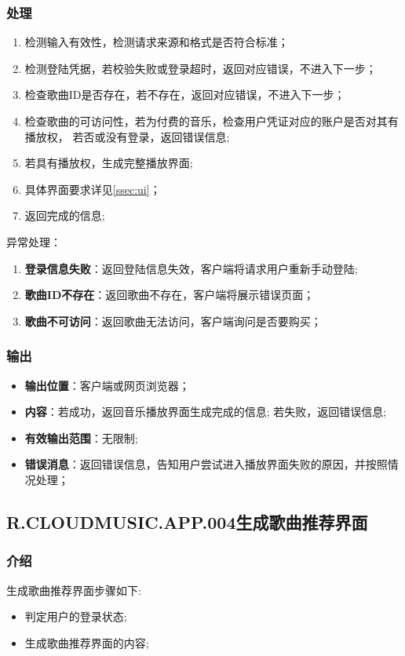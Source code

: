 \begin{enumerate}
\subsubsection{处理}
	\begin{enumerate}
		\item 检测输入有效性，检测请求来源和格式是否符合标准；
		\item 检测登陆凭据，若校验失败或登录超时，返回对应错误，不进入下一步；
		\item 检查歌曲ID是否存在，若不存在，返回对应错误，不进入下一步；
		\item 检查歌曲的可访问性，若为付费的音乐，检查用户凭证对应的账户是否对其有播放权，
			若否或没有登录，返回错误信息;
		\item 若具有播放权，生成完整播放界面;
		\item 具体界面要求详见\ref{ssec:ui}；
		\item 返回完成的信息;
	\end{enumerate}
	\noindent 异常处理：
	\begin{enumerate}
		\item \textbf{登录信息失败}：返回登陆信息失效，客户端将请求用户重新手动登陆;
		\item \textbf{歌曲ID不存在}：返回歌曲不存在，客户端将展示错误页面；
		\item \textbf{歌曲不可访问}：返回歌曲无法访问，客户端询问是否要购买；
	\end{enumerate}
\subsubsection{输出}
\begin{itemize}
	\item \textbf{输出位置}：客户端或网页浏览器；
	\item \textbf{内容}：若成功，返回音乐播放界面生成完成的信息; 若失败，返回错误信息;
	\item \textbf{有效输出范围}：无限制;
	\item \textbf{错误消息}：返回错误信息，告知用户尝试进入播放界面失败的原因，并按照情况处理；
\end{itemize}

\subsection{R.CLOUDMUSIC.APP.004生成歌曲推荐界面}
\subsubsection{介绍}
生成歌曲推荐界面步骤如下: 
	\begin{itemize}
		\item 判定用户的登录状态;
		\item 生成歌曲推荐界面的内容;
	\end{itemize}

\end{enumerate}
